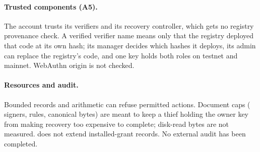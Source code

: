 \paragraph{Trusted components (A5).} The account trusts its verifiers and its
recovery controller, which gets no registry provenance check. A verified verifier
name means only that the registry deployed that code at its own hash; its manager
decides which hashes it deploys, its admin can replace the registry's code, and
one key holds both roles on testnet and mainnet. WebAuthn origin is not checked.

\paragraph{Resources and audit.} Bounded records and arithmetic can refuse
permitted actions. Document caps ( signers,
 rules,  canonical bytes) are
meant to keep a thief holding the owner key from making recovery too expensive to
complete; disk-read bytes are not measured.  does not extend
installed-grant records. No external audit has been completed.
